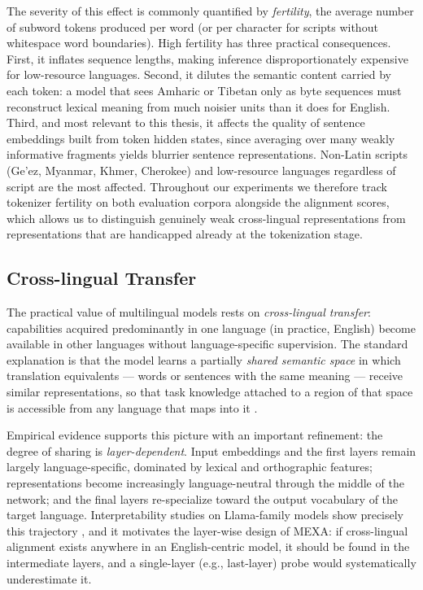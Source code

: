 The severity of this effect is commonly quantified by \emph{fertility},
the average number of subword tokens produced per word (or per character
for scripts without whitespace word boundaries). High fertility has three
practical consequences. First, it inflates sequence lengths, making
inference disproportionately expensive for low-resource languages. Second,
it dilutes the semantic content carried by each token: a model that sees
Amharic or Tibetan only as byte sequences must reconstruct lexical meaning
from much noisier units than it does for English. Third, and most relevant
to this thesis, it affects the quality of sentence embeddings built from
token hidden states, since averaging over many weakly informative fragments
yields blurrier sentence representations. Non-Latin scripts (Ge'ez,
Myanmar, Khmer, Cherokee) and low-resource languages regardless of script
are the most affected. Throughout our experiments we therefore track
tokenizer fertility on both evaluation corpora alongside the alignment
scores, which allows us to distinguish genuinely weak cross-lingual
representations from representations that are handicapped already at the
tokenization stage.

\subsection{Cross-lingual Transfer}
\label{subsec:transfer}

The practical value of multilingual models rests on \emph{cross-lingual
transfer}: capabilities acquired predominantly in one language (in
practice, English) become available in other languages without
language-specific supervision. The standard explanation is that the model
learns a partially \emph{shared semantic space} in which translation
equivalents --- words or sentences with the same meaning --- receive
similar representations, so that task knowledge attached to a region of
that space is accessible from any language that maps into it
\citep{hammerl2024survey}.

Empirical evidence supports this picture with an important refinement:
the degree of sharing is \emph{layer-dependent}. Input embeddings and the
first layers remain largely language-specific, dominated by lexical and
orthographic features; representations become increasingly
language-neutral through the middle of the network; and the final layers
re-specialize toward the output vocabulary of the target language.
Interpretability studies on Llama-family models show precisely this
trajectory \citep{wendler2024llamas,zhao2024multilingualism}, and it
motivates the layer-wise design of MEXA: if cross-lingual alignment exists
anywhere in an English-centric model, it should be found in the
intermediate layers, and a single-layer (e.g., last-layer) probe would
systematically underestimate it.

